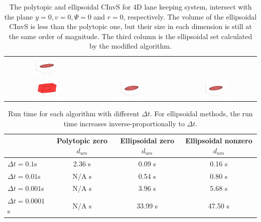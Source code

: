 \documentclass{article}
\begin{document}
\begin{table}[H]
\begin{tabular}{ccc}
		\includegraphics[width=0.3\textwidth]{lk/ellip3_conservative.pdf} \\
		\includegraphics[width=0.3\textwidth]{lk/poly4.pdf} & \includegraphics[width=0.3\textwidth]{lk/ellip4.pdf}&
		\includegraphics[width=0.3\textwidth]{lk/ellip4_conservative.pdf} \\
	\end{tabular}
	\caption{The polytopic and ellipsoidal CInvS for 4D lane keeping system, intersect with the plane $y=0, v=0, \Psi=0$ and $r=0$, respectively. The volume of the ellipsoidal CInvS is  less than the polytopic one, but their size in each dimension is still at the same order of magnitude. The third column is the ellipsoidal set calculated by the modified algorithm.}
	\label{lk}
\end{table}

\begin{table}[H]
	\centering
	\begin{tabular}{|l|c|c|c|}
		\hline
		&  \makecell{Polytopic \\zero $d_{um}$} &  \makecell{Ellipsoidal \\zero $d_{um}$} & \makecell{Ellipsoidal \\nonzero $d_{um}$}\\
		\hline
		$\Delta t = 0.1$s & 2.36 s & 0.09 s & 0.16 s\\
		$\Delta t = 0.01$s & N/A s & 0.54 s & 0.80 s\\
		$\Delta t = 0.001$s & N/A s & 3.96 s & 5.68 s\\
		$\Delta t = 0.0001$s & N/A s & 33.99 s & 47.50 s\\
		\hline
	\end{tabular}
	\caption{Run time for each algorithm with different $\Delta t$. For ellipsoidal methods, the run time increases inverse-proportionally to $\Delta t$.}
	\label{lk_runtime}
\end{table}
\end{document}
